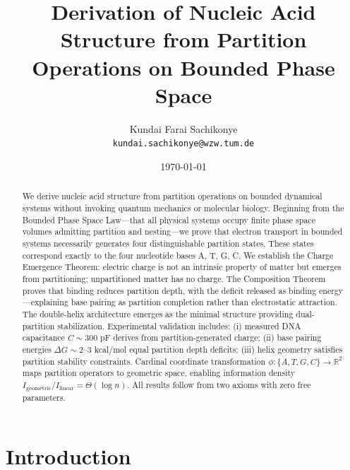 \documentclass[twocolumn,10pt,a4paper]{article}
\theoremstyle{definition}
\theoremstyle{remark}
\begin{document}
\title{\textbf{Derivation of Nucleic Acid Structure from Partition Operations on Bounded Phase Space}}

\author{
Kundai Farai Sachikonye\\
\texttt{kundai.sachikonye@wzw.tum.de}
}

\date{\today}

\maketitle

\begin{abstract}
\noindent We derive nucleic acid structure from partition operations on bounded dynamical systems without invoking quantum mechanics or molecular biology. Beginning from the Bounded Phase Space Law---that all physical systems occupy finite phase space volumes admitting partition and nesting---we prove that electron transport in bounded systems necessarily generates four distinguishable partition states. These states correspond exactly to the four nucleotide bases A, T, G, C. We establish the Charge Emergence Theorem: electric charge is not an intrinsic property of matter but emerges from partitioning; unpartitioned matter has no charge. The Composition Theorem proves that binding reduces partition depth, with the deficit released as binding energy---explaining base pairing as partition completion rather than electrostatic attraction. The double-helix architecture emerges as the minimal structure providing dual-partition stabilization. Experimental validation includes: (i) measured DNA capacitance $C \sim 300$ pF derives from partition-generated charge; (ii) base pairing energies $\Delta G \sim 2$--$3$ kcal/mol equal partition depth deficits; (iii) helix geometry satisfies partition stability constraints. Cardinal coordinate transformation $\phi: \{A,T,G,C\} \to \mathbb{R}^2$ maps partition operators to geometric space, enabling information density $I_{\text{geometric}}/I_{\text{linear}} = \Theta(\log n)$. All results follow from two axioms with zero free parameters.
\end{abstract}

\section{Introduction}
\label{sec:introduction}
\end{document}
